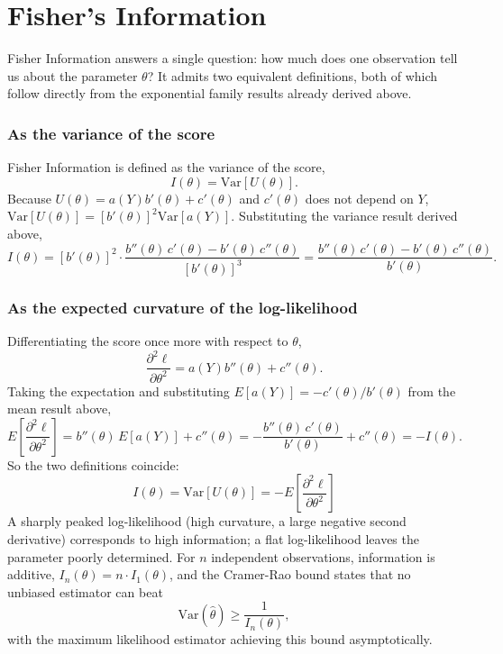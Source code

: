 \documentclass[12pt,a4paper]{report}
\begin{document}
\section{Fisher's Information}

Fisher Information answers a single question: how much does one observation tell us about the parameter $\theta$? It admits two equivalent definitions, both of which follow directly from the exponential family results already derived above.

\subsubsection*{As the variance of the score}

Fisher Information is defined as the variance of the score,
\[
I(\theta) = \text{Var}[U(\theta)].
\]
Because $U(\theta) = a(Y)b'(\theta) + c'(\theta)$ and $c'(\theta)$ does not depend on $Y$, $\text{Var}[U(\theta)] = \left[b'(\theta)\right]^2 \text{Var}[a(Y)]$. Substituting the variance result derived above,
\[
I(\theta) = \left[b'(\theta)\right]^2 \cdot \frac{b''(\theta)\,c'(\theta) - b'(\theta)\,c''(\theta)}{\left[b'(\theta)\right]^{3}} = \frac{b''(\theta)\,c'(\theta) - b'(\theta)\,c''(\theta)}{b'(\theta)}.
\]

\subsubsection*{As the expected curvature of the log-likelihood}

Differentiating the score once more with respect to $\theta$,
\[
\frac{\partial^2 \ell}{\partial \theta^2} = a(Y)b''(\theta) + c''(\theta).
\]
Taking the expectation and substituting $E[a(Y)] = -c'(\theta)/b'(\theta)$ from the mean result above,
\[
E\left[\frac{\partial^2 \ell}{\partial \theta^2}\right] = b''(\theta)\,E[a(Y)] + c''(\theta) = -\frac{b''(\theta)\,c'(\theta)}{b'(\theta)} + c''(\theta) = -I(\theta).
\]
So the two definitions coincide:
\[
\boxed{I(\theta) = \text{Var}[U(\theta)] = -E\left[\frac{\partial^2 \ell}{\partial \theta^2}\right]}
\]
A sharply peaked log-likelihood (high curvature, a large negative second derivative) corresponds to high information; a flat log-likelihood leaves the parameter poorly determined. For $n$ independent observations, information is additive, $I_n(\theta) = n \cdot I_1(\theta)$, and the Cramer-Rao bound states that no unbiased estimator can beat
\[
\text{Var}(\hat\theta) \geq \frac{1}{I_n(\theta)},
\]
with the maximum likelihood estimator achieving this bound asymptotically.
\end{document}
